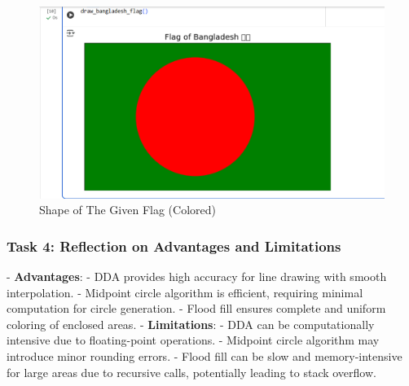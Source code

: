 \documentclass[12pt]{article}
\begin{document}
\begin{figure}[H]
    \centering
    \includegraphics[width=1.0\textwidth]{bd_flag.png}
    \caption{Shape of The Given Flag (Colored)}
\end{figure}



\subsubsection*{Task 4: Reflection on Advantages and Limitations}
- \textbf{Advantages}: 
  - DDA provides high accuracy for line drawing with smooth interpolation.
  - Midpoint circle algorithm is efficient, requiring minimal computation for circle generation.
  - Flood fill ensures complete and uniform coloring of enclosed areas.
- \textbf{Limitations}: 
  - DDA can be computationally intensive due to floating-point operations.
  - Midpoint circle algorithm may introduce minor rounding errors.
  - Flood fill can be slow and memory-intensive for large areas due to recursive calls, potentially leading to stack overflow.
\end{document}
